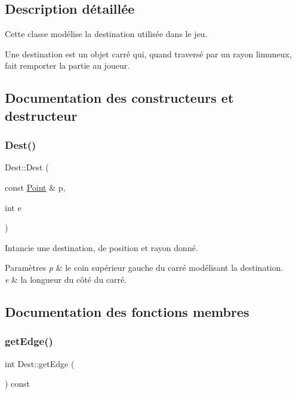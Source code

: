 \subsection{Description détaillée}
Cette classe modélise la destination utilisée dans le jeu. 

Une destination est un objet carré qui, quand traversé par un rayon limuneux, fait remporter la partie au joueur. 

\subsection{Documentation des constructeurs et destructeur}
\mbox{\label{class_dest_a7d7223268dd4de01395367c9adb499e8}} 
\subsubsection{\texorpdfstring{Dest()}{Dest()}}
{\footnotesize\ttfamily Dest\+::\+Dest (\begin{DoxyParamCaption}\item[{const \mbox{\hyperlink{class_point}{Point}} \&}]{p,  }\item[{int}]{e }\end{DoxyParamCaption})}

Intancie une destination, de position et rayon donné. 
\begin{DoxyParams}{Paramètres}
{\em p} & le coin supérieur gauche du carré modélisant la destination. \\
\hline
{\em e} & la longueur du côté du carré. \\
\hline
\end{DoxyParams}


\subsection{Documentation des fonctions membres}
\mbox{\label{class_dest_aa650b5bc32a2df18899cf811edd19ec7}} 
\subsubsection{\texorpdfstring{getEdge()}{getEdge()}}
{\footnotesize\ttfamily int Dest\+::get\+Edge (\begin{DoxyParamCaption}{ }\end{DoxyParamCaption}) const}

